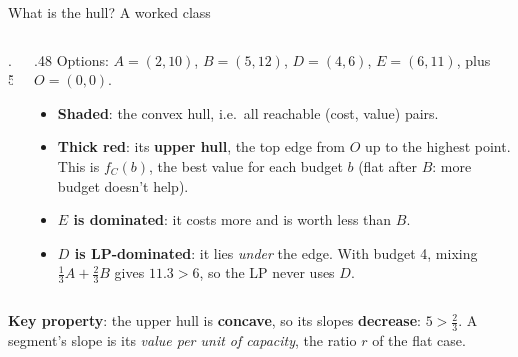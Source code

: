 \documentclass[aspectratio=169,11pt]{beamer}
\begin{document}
\begin{frame}{What is the hull? A worked class}
\footnotesize
\begin{columns}[T]
\begin{column}{.5\textwidth}
\centering
{}
\end{column}
\begin{column}{.48\textwidth}
Options: $A{=}(2,10)$, $B{=}(5,12)$, $D{=}(4,6)$, $E{=}(6,11)$, plus $O{=}(0,0)$.
\begin{itemize}\setlength\itemsep{2pt}
\item \textbf{Shaded}: the convex hull, i.e.\ all reachable (cost, value) pairs.
\item \textbf{Thick red}: its \textbf{upper hull}, the top edge from $O$ up to the highest point. This is $f_C(b)$, the best
  value for each budget $b$ (flat after $B$: more budget doesn't help).
\item \textbf{$E$ is dominated}: it costs more and is worth less than $B$.
\item \textbf{$D$ is LP-dominated}: it lies \emph{under} the edge. With budget 4, mixing $\frac13 A + \frac23 B$ gives
  $11.3 > 6$, so the LP never uses $D$.
\end{itemize}
\end{column}
\end{columns}
\vspace{1mm}
\textbf{Key property}: the upper hull is \textbf{concave}, so its slopes \textbf{decrease}: $5 > \frac23$.
A segment's slope is its \emph{value per unit of capacity}, the ratio $r$ of the flat case.
\end{frame}
\end{document}
